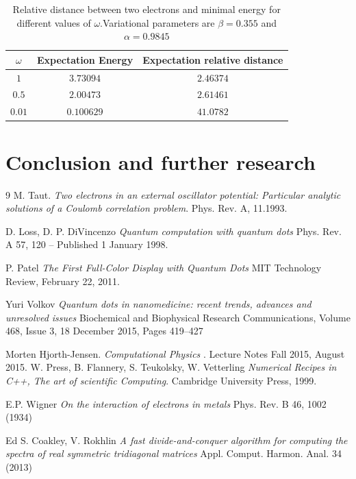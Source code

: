 \documentclass[10pt]{article}
\begin{document}
\begin{table}[h!]
  \caption{Relative distance between two electrons and minimal energy for different values of $\omega$.Variational parameters are $\beta = 0.355$ and $\alpha = 0.9845$}
  \label{tab:two}
  \begin{center}
    \begin{tabular}{c|c|c}
    \hline
		$\omega$ & Expectation Energy & Expectation relative distance \\
    \hline
	$	1 $  & $3.73094$ & $2.46374$  \\
	$	0.5$  & $2.00473$ & $2.61461$   \\
	$	0.01$  & $0.100629$ & $41.0782$   \\
	\end{tabular}
  \end{center}
\end{table}


\newpage
\clearpage
\section{Conclusion and further research}\label{conc}


\clearpage
\newpage

\begin{thebibliography} {9}
M. Taut. 
\textit{Two electrons in an external oscillator potential: Particular analytic solutions of a Coulomb correlation problem}.
Phys. Rev. A, 11.1993.


D. Loss, D. P. DiVincenzo
\textit{
Quantum computation with quantum dots
}
Phys. Rev. A 57, 120 – Published 1 January 1998.

P. Patel
\textit
{The First Full-Color Display with Quantum Dots
}
MIT Technology Review, February 22, 2011.

Yuri Volkov
\textit
{Quantum dots in nanomedicine: recent trends, advances and unresolved issues
}
Biochemical and Biophysical Research Communications, Volume 468, Issue 3, 18 December 2015, Pages 419–427

Morten Hjorth-Jensen. 
\textit{Computational Physics
}. 
Lecture Notes Fall 2015, August 2015.
W. Press, B. Flannery, S. Teukolsky, W. Vetterling 
\textit{Numerical Recipes in C++, The art of scientific Computing}. 
Cambridge University Press, 1999.


E.P. Wigner
\textit
{On the interaction of electrons in metals
}
Phys. Rev. B 46, 1002 (1934) 

Ed S. Coakley, V. Rokhlin
\textit
{A fast divide-and-conquer algorithm for computing the spectra of real
symmetric tridiagonal matrices
}
Appl. Comput. Harmon. Anal. 34 (2013)

\end{thebibliography}
\end{document}
